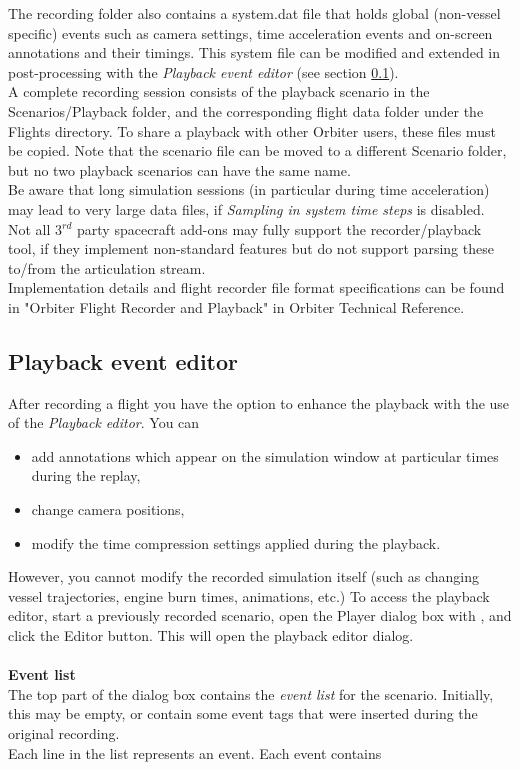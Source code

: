 \documentclass[Orbiter User Manual.tex]{subfiles}
\begin{document}
\noindent
The recording folder also contains a system.dat file that holds global (non-vessel specific) events such as camera settings, time acceleration events and on-screen annotations and their timings. This system file can be modified and extended in post-processing with the \textit{Playback event editor} (see section \ref{sec:flight_playbackedit}).\\
A complete recording session consists of the playback scenario in the Scenarios/Playback folder, and the corresponding flight data folder under the Flights directory. To share a playback with other Orbiter users, these files must be copied. Note that the scenario file can be moved to a different Scenario folder, but no two playback scenarios can have the same name.\\
Be aware that long simulation sessions (in particular during time acceleration) may lead to very large data files, if \textit{Sampling in system time steps} is disabled.\\
Not all 3$^{rd}$ party spacecraft add-ons may fully support the recorder/playback tool, if they implement non-standard features but do not support parsing these to/from the articulation stream.\\
Implementation details and flight recorder file format specifications can be found in "Orbiter Flight Recorder and Playback" in Orbiter Technical Reference.


\subsection{Playback event editor}
\label{sec:flight_playbackedit}
After recording a flight you have the option to enhance the playback with the use of the \textit{Playback editor}. You can

\begin{itemize}
\item add annotations which appear on the simulation window at particular times during the replay,
\item change camera positions,
\item modify the time compression settings applied during the playback.
\end{itemize}

\noindent
However, you cannot modify the recorded simulation itself (such as changing vessel trajectories, engine burn times, animations, etc.) To access the playback editor, start a previously recorded scenario, open the Player dialog box with \Ctrl{}, and click the Editor button. This will open the playback editor dialog.\\
\\
\textbf{Event list}\\
The top part of the dialog box contains the \textit{event list} for the scenario. Initially, this may be empty, or contain some event tags that were inserted during the original recording.\\
Each line in the list represents an event. Each event contains
\end{document}
